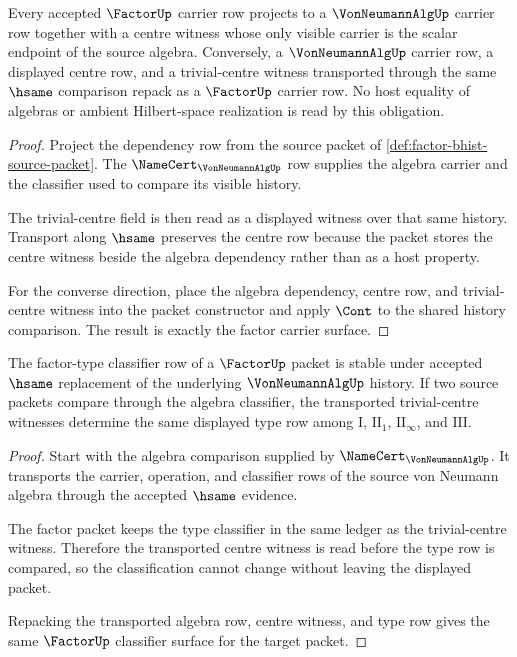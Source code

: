 \begin{theorem}
\label{thm:factor-carrier-trivial-centre-obligation}
Every accepted $\FactorUp$ carrier row projects to a
$\VonNeumannAlgUp$ carrier row together with a centre witness whose only
visible carrier is the scalar endpoint of the source algebra. Conversely, a
$\VonNeumannAlgUp$ carrier row, a displayed centre row, and a trivial-centre
witness transported through the same $\hsame$ comparison repack as a
$\FactorUp$ carrier row. No host equality of algebras or ambient Hilbert-space
realization is read by this obligation.
\end{theorem}
\begin{proof}
Project the dependency row from the source packet of
\autoref{def:factor-bhist-source-packet}. The $\NameCert_{\VonNeumannAlgUp}$
row supplies the algebra carrier and the classifier used to compare its
visible history.

The trivial-centre field is then read as a displayed witness over that same
history. Transport along $\hsame$ preserves the centre row because the packet
stores the centre witness beside the algebra dependency rather than as a host
property.

For the converse direction, place the algebra dependency, centre row, and
trivial-centre witness into the packet constructor and apply $\Cont$ to the
shared history comparison. The result is exactly the factor carrier surface.
\end{proof}

\begin{theorem}
\label{thm:factor-type-classifier-stability-obligation}
The factor-type classifier row of a $\FactorUp$ packet is stable under
accepted $\hsame$ replacement of the underlying $\VonNeumannAlgUp$ history.
If two source packets compare through the algebra classifier, the transported
trivial-centre witnesses determine the same displayed type row among
$\mathrm{I}$, $\mathrm{II}_1$, $\mathrm{II}_\infty$, and $\mathrm{III}$.
\end{theorem}
\begin{proof}
Start with the algebra comparison supplied by
$\NameCert_{\VonNeumannAlgUp}$. It transports the carrier, operation, and
classifier rows of the source von Neumann algebra through the accepted
$\hsame$ evidence.

The factor packet keeps the type classifier in the same ledger as the
trivial-centre witness. Therefore the transported centre witness is read
before the type row is compared, so the classification cannot change without
leaving the displayed packet.

Repacking the transported algebra row, centre witness, and type row gives the
same $\FactorUp$ classifier surface for the target packet.
\end{proof}


